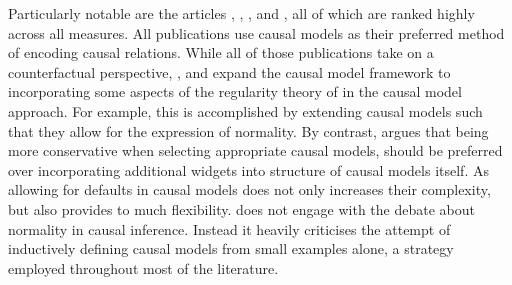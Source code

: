 \documentclass[11pt,a4paper]{book}
\theoremstyle{definition}
\theoremstyle{definition}
\theoremstyle{definition}
\theoremstyle{remark}
\begin{document}
Particularly notable are the articles \cite{weslake2015partial}, \cite{blanchard2017cause}, \cite{halpern2011actual}, \cite{glymour2010actual} and \cite{halpern2015graded}, all of which are ranked highly across all measures. 
All publications use causal models as their preferred method of encoding causal relations.  
While all of those publications take on a counterfactual perspective, \parencite{halpern2011actual}, \parencite{weslake2015partial} and \parencite{halpern2015graded} expand the causal model framework to incorporating some aspects of the regularity theory of in the causal model approach. For example, this is accomplished by extending causal models such that they allow for the expression of normality.
By contrast, \parencite{blanchard2017cause} argues that being more conservative when selecting appropriate causal models, should be preferred over incorporating additional widgets into structure of causal models itself.
As allowing for defaults in causal models does not only increases their complexity, but also provides to much flexibility. 
\parencite{glymour2010actual} does not engage with the debate about normality in causal inference. Instead it heavily criticises the attempt of inductively defining causal models from small examples alone, a strategy employed  throughout most of the literature.
\end{document}
